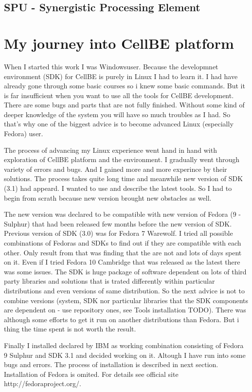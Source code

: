 \documentclass{article}
\begin{document}
\subsection{SPU - Synergistic Processing Element}


\section{My journey into CellBE platform}
When I started this work I was Windows\textregistered user. Because the developmnet environment (SDK) for CellBE is purely in Linux I had to learn it. I had have already gone through some basic courses so i knew some basic commands. But it is far insufficient when you want to use all the tools for CellBE development. There are some bugs and parts that are not fully finished. Without some kind of deeper knowledge of the system you will have so much troubles as I had. So that's why one of the biggest advice is to become advanced Linux (especially Fedora) user.

The process of advancing my Linux experience went hand in hand with exploration of CellBE platform and the environment. I gradually went through variety of errors and bugs. And I gained more and more experince by their solutions. The process takes quite long time and meanwhile new version of SDK (3.1) had appeard. I wanted to use and describe the latest tools. So I had to begin from scrath because new version brought new obstacles as well.

The new version was declared to be compatible with new version of Fedora (9 - Sulphur) that had been released few months before the new version of SDK. Previous version of SDK (3.0) was for Fedora 7 Warewolf. I tried all possible combinations of Fedoras and SDKs to find out if they are compatible with each other. Only result from that was finding that the are not and lots of days spent on it. Even if I tried Fedora 10 Cambridge that was released as the latest there was some issues. The SDK is huge package of software dependent on lots of third party libraries and solutions that is trated differently within particular distributions and even versions of same distribution. So the next advice is not to combine versions (system, SDK nor particular libraries that the SDK components are dependent on - use repository ones, see Tools installation TODO). There was although some efforts to get it run on another distributions than Fedora. But i thing the time spent is not worth the result.

Finally I installed declared by IBM as working combination consisting of Fedora 9 Sulphur and SDK 3.1 and decided working on it. Altough I have run into some bugs and errors. The process of installation is described in next section. Installation of Fedora is omited. For details see official site http://fedoraproject.org/.
\end{document}
